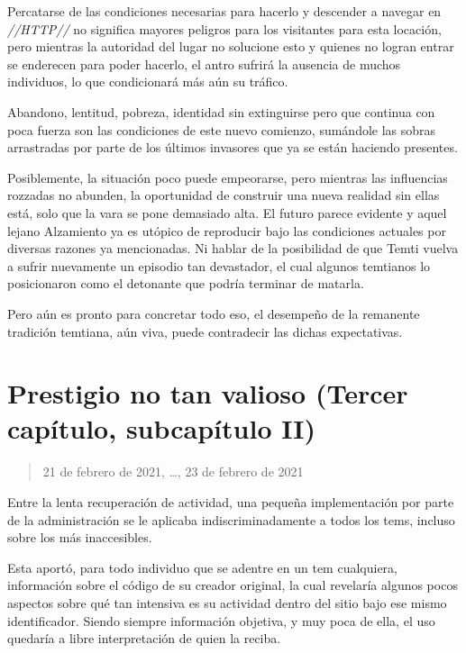 \documentclass[
  spanish,
]{book}
\begin{document}
Percatarse de las condiciones necesarias para hacerlo y descender a navegar en \emph{//HTTP//} no significa mayores peligros para los visitantes para esta locación, pero mientras la autoridad del lugar no solucione esto y quienes no logran entrar se enderecen para poder hacerlo, el antro sufrirá la ausencia de muchos individuos, lo que condicionará más aún su tráfico.

Abandono, lentitud, pobreza, identidad sin extinguirse pero que continua con poca fuerza son las condiciones de este nuevo comienzo, sumándole las sobras arrastradas por parte de los últimos invasores que ya se están haciendo presentes.

Posiblemente, la situación poco puede empeorarse, pero mientras las influencias rozzadas no abunden, la oportunidad de construir una nueva realidad sin ellas está, solo que la vara se pone demasiado alta. El futuro parece evidente y aquel lejano Alzamiento ya es utópico de reproducir bajo las condiciones actuales por diversas razones ya mencionadas. Ni hablar de la posibilidad de que Temti vuelva a sufrir nuevamente un episodio tan devastador, el cual algunos temtianos lo posicionaron como el detonante que podría terminar de matarla.

Pero aún es pronto para concretar todo eso, el desempeño de la remanente tradición temtiana, aún viva, puede contradecir las dichas expectativas.

\hypertarget{prestigio-no-tan-valioso-tercer-capuxedtulo-subcapuxedtulo-ii}{%
\section{Prestigio no tan valioso (Tercer capítulo, subcapítulo II)}\label{prestigio-no-tan-valioso-tercer-capuxedtulo-subcapuxedtulo-ii}}

\begin{quote}
21 de febrero de 2021, \ldots, 23 de febrero de 2021
\end{quote}

Entre la lenta recuperación de actividad, una pequeña implementación por parte de la administración se le aplicaba indiscriminadamente a todos los tems, incluso sobre los más inaccesibles.

Esta aportó, para todo individuo que se adentre en un tem cualquiera, información sobre el código de su creador original, la cual revelaría algunos pocos aspectos sobre qué tan intensiva es su actividad dentro del sitio bajo ese mismo identificador. Siendo siempre información objetiva, y muy poca de ella, el uso quedaría a libre interpretación de quien la reciba.
\end{document}
